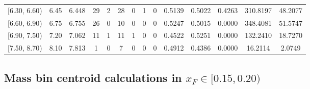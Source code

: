\begin{table}[htbp]
{\begin{tabular}{cc|c|cccccc|ccc|cc}
        {[6.30, 6.60)} & 6.45 & 6.448 & 29 & 2 & 28 & 0 & 1 & 0 & 0.5139 & 0.5022 & 0.4263 & 310.8197 & 48.2077 \\
        {[6.60, 6.90)} & 6.75 & 6.755 & 26 & 0 & 10 & 0 & 0 & 0 & 0.5247 & 0.5015 & 0.0000 & 348.4081 & 51.5747 \\
        {[6.90, 7.50)} & 7.20 & 7.062 & 11 & 1 & 11 & 1 & 0 & 0 & 0.4522 & 0.5251 & 0.0000 & 132.2410 & 18.7270 \\
        {[7.50, 8.70)} & 8.10 & 7.813 & 1 & 0 & 7 & 0 & 0 & 0 & 0.4912 & 0.4386 & 0.0000 & 16.2114 & 2.0749 \\
        \hline\hline
    \end{tabular}
    }
\end{table}

\clearpage
\subsection{\texorpdfstring{Mass bin centroid calculations in $x_F \in [0.15, 0.20)$}{Mass bin centroid calculations in x\_F in [0.15, 0.20)]}}

